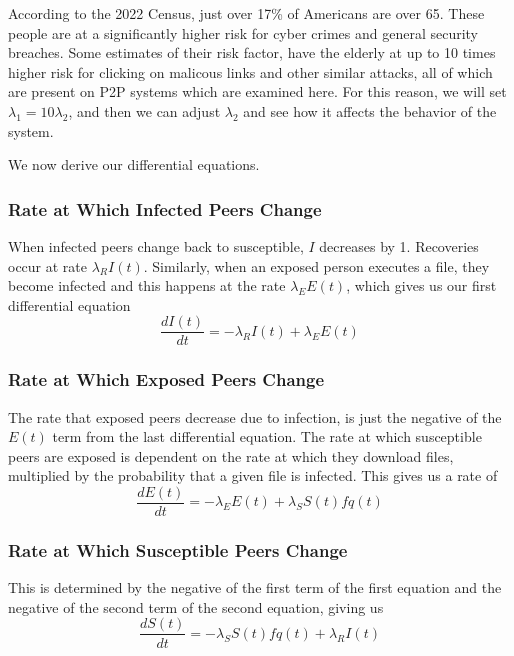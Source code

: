 \documentclass[12pt, oneside]{article}
\begin{document}
        According to the 2022 Census, just over 17\% of Americans are over 65\cite{uscensus2022}. These people are at a significantly higher risk for 
        cyber crimes and general security breaches\cite{blackwood-brown2018}. Some estimates of their risk factor, have the elderly at up to 10 times higher
        risk for clicking on malicous links and other similar attacks, all of which are present on P2P systems which are examined here. For this reason, we will set
        $\lambda_1 = 10\lambda_2$, and then we can adjust $\lambda_2$ and see how it affects the behavior of the system. 

        We now derive our differential equations.
        \subsubsection{Rate at Which Infected Peers Change}
        When infected peers change back to susceptible,  $I$ decreases by 1. Recoveries occur at rate  $\lambda_R I(t)$.
        Similarly, when an exposed person executes a file, they become infected and this happens at the rate $\lambda_E E(t)$, which
        gives us our first differential equation \[
        \frac{dI(t)}{dt}=-\lambda_R I(t)+\lambda_E E(t)
        \] 
        \subsubsection{Rate at Which Exposed Peers Change}
        The rate that exposed peers decrease due to infection, is just the negative of the $E(t)$ term from the last differential equation.
        The rate at which susceptible peers are exposed is dependent on the rate at which they download files, multiplied by the probability
        that a given file is infected. This gives us a rate of \[
            \frac{dE(t)}{dt}=-\lambda_E E(t)+\lambda_S S(t)f{q(t)}
        \]
        \subsubsection{Rate at Which Susceptible Peers Change}
        This is determined by the negative of the first term of the first equation and the negative of the second term of the second equation, giving us
        \[
            \frac{dS(t)}{dt}=-\lambda_S S(t)f{q(t)}+\lambda_R I(t)
        \]
\end{document}
